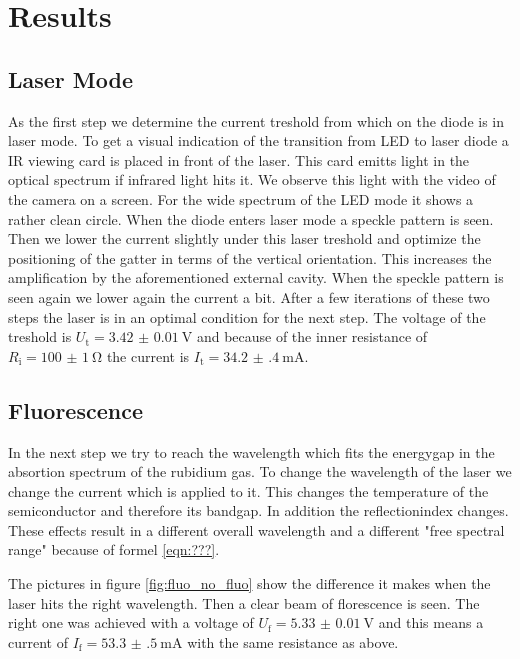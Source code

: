 \section{Results}
\label{sec:Auswertung}

\subsection{Laser Mode}

As the first step we determine the current treshold from which on the diode is in laser mode. To get a visual indication of the transition from LED to laser diode a IR viewing card is placed in front of the laser. This card emitts light in the optical spectrum if infrared light hits it. We observe this light with the video of the camera on a screen. For the wide spectrum of the LED mode it shows a rather clean circle. When the diode enters laser mode a speckle pattern is seen. Then we lower the current slightly under this laser treshold and optimize the positioning of the gatter in terms of the vertical orientation. This increases the amplification by the aforementioned external cavity. When the speckle pattern is seen again we lower again the current a bit. After a few iterations of these two steps the laser is in an optimal condition for the next step. The voltage of the treshold is $U_\text{t} = \SI{3.42(1)}{\volt}$ and because of the inner resistance of $R_\text{i} = \SI{100(1)}{\ohm}$ the current is $I_\text{t} = \SI{34.2(4)}{\milli\ampere}$.

\subsection{Fluorescence}

In the next step we try to reach the wavelength which fits the energygap in the absortion spectrum of the rubidium gas. To change the wavelength of the laser we change the current which is applied to it. This changes the temperature of the semiconductor and therefore its bandgap. In addition the reflectionindex changes. These effects result in a different overall wavelength and a different "free spectral range" because of formel \eqref{eqn:???}.

The pictures in figure \ref{fig:fluo_no_fluo} show the difference it makes when the laser hits the right wavelength. Then a clear beam of florescence is seen. The right one was achieved with a voltage of $U_\text{f} = \SI{5.33(1)}{\volt}$ and this means a current of $I_\text{f} = \SI{53.3(5)}{\milli\ampere}$ with the same resistance as above.

